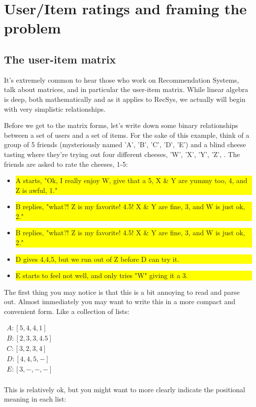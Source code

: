 \chapter{User/Item ratings and framing the problem}
\label{ch:user-item}

\section{The user-item matrix}

It's extremely common to hear those who work on Recommendation Systems, talk about matrices, and in particular the user-item matrix. While linear algebra is deep, both mathematically and as it applies to RecSys, we actually will begin with very simplistic relationships. 

Before we get to the matrix forms, let's write down some binary relationships between a set of users and a set of items. For the sake of this example, think of a group of 5 friends (mysteriously named 'A', 'B', 'C', 'D', 'E') and a blind cheese tasting where they're trying out four different cheeses, 'W', 'X', 'Y', 'Z', . The friends are asked to rate the cheeses, 1-5:
\begin{itemize}
    \item \colorbox{yellow}{\parbox{\textwidth-10pt}{
 A starts,  "Ok, I really enjoy W, give that a 5, X \& Y are yummy too, 4, and Z is awful, 1."
}}
    \item \colorbox{yellow}{\parbox{\textwidth-10pt}{
 B replies, "what?! Z is my favorite! 4.5! X \& Y are fine, 3, and W is just ok, 2."
}}
    \item \colorbox{yellow}{\parbox{\textwidth-10pt}{
 B replies, "what?! Z is my favorite! 4.5! X \& Y are fine, 3, and W is just ok, 2."
}}
    \item \colorbox{yellow}{\parbox{\textwidth-10pt}{
 D gives 4,4,5, but we run out of Z before D can try it. 
}}
    \item \colorbox{yellow}{\parbox{\textwidth-10pt}{
 E starts to feel not well, and only tries "W" giving it a 3.
}}
\end{itemize}

The first thing you may notice is that this is a bit annoying to read and parse out. Almost immediately you may want to write this in a more compact and convenient form. Like a collection of lists:

\begin{center}
\begin{math}
\begin{array}{cc}
    A:[5,4,4,1] \\
    B:[2,3,3,4.5] \\
    C:[3,2,3,4] \\
    D:[4,4,5,-] \\
    E:[3,-,-,-] \\
\end{array}
\end{math}
\end{center}
This is relatively ok, but you might want to more clearly indicate the positional meaning in each list:

